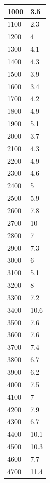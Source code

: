 \begin{center}
\begin{tabularx}{\textwidth}{|X|X|}
        1000 & 3.5 \\ \hline
        1100 & 2.3 \\ \hline
        1200 & 4 \\ \hline
        1300 & 4.1 \\ \hline
        1400 & 4.3 \\ \hline
        1500 & 3.9 \\ \hline
        1600 & 3.4 \\ \hline
        1700 & 4.2 \\ \hline
        1800 & 4.9 \\ \hline
        1900 & 5.1 \\ \hline
        2000 & 3.7 \\ \hline
        2100 & 4.3 \\ \hline
        2200 & 4.9 \\ \hline
        2300 & 4.6 \\ \hline
        2400 & 5 \\ \hline
        2500 & 5.9 \\ \hline
        2600 & 7.8 \\ \hline
        2700 & 10 \\ \hline
        2800 & 7 \\ \hline
        2900 & 7.3 \\ \hline
        3000 & 6 \\ \hline
        3100 & 5.1 \\ \hline
        3200 & 8 \\ \hline
        3300 & 7.2 \\ \hline
        3400 & 10.6 \\ \hline
        3500 & 7.6 \\ \hline
        3600 & 7.6 \\ \hline
        3700 & 7.4 \\ \hline
        3800 & 6.7 \\ \hline
        3900 & 6.2 \\ \hline
        4000 & 7.5 \\ \hline
        4100 & 7 \\ \hline
        4200 & 7.9 \\ \hline
        4300 & 6.7 \\ \hline
        4400 & 10.1 \\ \hline
        4500 & 10.3 \\ \hline
        4600 & 7.7 \\ \hline
        4700 & 11.4 \\ \hline

\end{tabularx}
\end{center}
